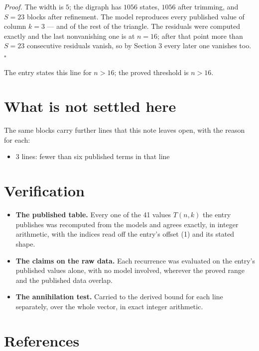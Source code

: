 \documentclass[11pt]{article}
\theoremstyle{definition}
\begin{document}
{\itshape Proof.} The width is $5$; the digraph has $1056$ states, $1056$ after trimming, and $S = 23$ blocks after refinement. The model reproduces every published value of column $k = 3$ --- and of the rest of the triangle. The residuals were computed exactly and the last nonvanishing one is at $n = 16$; after that point more than $S = 23$ consecutive residuals vanish, so by Section 3 every later one vanishes too. $\square$

The entry states this line for $n > 16$; the proved threshold is $n > 16$.

\section{What is not settled here}

The same blocks carry further lines that this note leaves open, with the reason for each:

\begin{itemize}

\item 3 lines: fewer than six published terms in that line

\end{itemize}

\section{Verification}

\begin{itemize}

\item {\bfseries The published table.} Every one of the 41 values $T(n,k)$ the entry publishes was recomputed from the models and agrees exactly, in integer arithmetic, with the indices read off the entry's offset (1) and its stated shape.

\item {\bfseries The claims on the raw data.} Each recurrence was evaluated on the entry's published values alone, with no model involved, wherever the proved range and the published data overlap.

\item {\bfseries The annihilation test.} Carried to the derived bound for each line separately, over the whole vector, in exact integer arithmetic.

\end{itemize}

\section{References}
\end{document}
